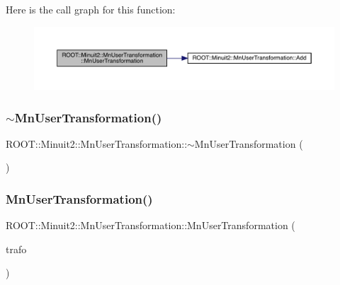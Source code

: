 Here is the call graph for this function\+:\nopagebreak
\begin{figure}[H]
\begin{center}
\leavevmode
\includegraphics[width=350pt]{d9/d98/classROOT_1_1Minuit2_1_1MnUserTransformation_a75c58c9381f8c42adcee7319d2671918_cgraph}
\end{center}
\end{figure}
\mbox{\label{classROOT_1_1Minuit2_1_1MnUserTransformation_a1510c72a07c9d089f16a4536ceacde56}} 
\subsubsection{\texorpdfstring{$\sim$MnUserTransformation()}{~MnUserTransformation()}\hspace{0.1cm}{\footnotesize\ttfamily [1/2]}}
{\footnotesize\ttfamily R\+O\+O\+T\+::\+Minuit2\+::\+Mn\+User\+Transformation\+::$\sim$\+Mn\+User\+Transformation (\begin{DoxyParamCaption}{ }\end{DoxyParamCaption})\hspace{0.3cm}{\ttfamily [inline]}}

\mbox{\label{classROOT_1_1Minuit2_1_1MnUserTransformation_ae2bba4ce251f0eab8719900620addef9}} 
\subsubsection{\texorpdfstring{MnUserTransformation()}{MnUserTransformation()}\hspace{0.1cm}{\footnotesize\ttfamily [3/6]}}
{\footnotesize\ttfamily R\+O\+O\+T\+::\+Minuit2\+::\+Mn\+User\+Transformation\+::\+Mn\+User\+Transformation (\begin{DoxyParamCaption}\item[{const \mbox{\hyperlink{classROOT_1_1Minuit2_1_1MnUserTransformation}{Mn\+User\+Transformation}} \&}]{trafo }\end{DoxyParamCaption})\hspace{0.3cm}{\ttfamily [inline]}}

